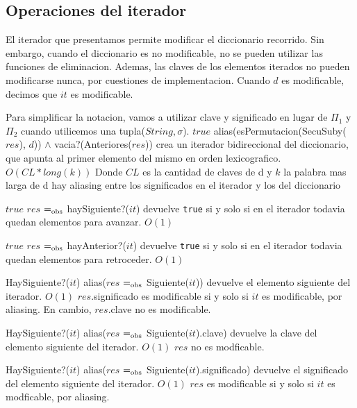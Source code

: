  
  \subsection{Operaciones del iterador}

  El iterador que presentamos permite modificar el diccionario recorrido.  Sin embargo, cuando el diccionario es no modificable, no se pueden utilizar las funciones de eliminacion.  Ademas, las claves de los elementos iterados no pueden modificarse nunca, por cuestiones de implementacion.  Cuando $d$ es modificable, decimos que $it$ es modificable.
  

  Para simplificar la notacion, vamos a utilizar clave y significado en lugar de $\Pi_1$ y $\Pi_2$ cuando utilicemos una tupla($String,\sigma$).
 {$true$}
 {alias(esPermutacion(SecuSuby($res$), $d$)) $\land$ vacia?(Anteriores($res$))}
 {crea un iterador bidireccional del diccionario, que apunta al primer elemento del mismo en orden lexicografico.}
  {$O(CL*long(k))$ Donde $CL$ es la cantidad de claves de d y $k$ la palabra mas larga de d}
  {hay aliasing entre los significados en el iterador y los del diccionario}


	{$true$}  
  {$res$ $=_{\mathrm{obs}}$ haySiguiente?($it$)}
  {devuelve \texttt{true} si y solo si en el iterador todavia quedan elementos para avanzar.}
  {$O(1)$}
  {}

	{$true$}    
  {$res$ $=_{\mathrm{obs}}$ hayAnterior?($it$)}
  {devuelve \texttt{true} si y solo si en el iterador todavia quedan elementos para retroceder.}
  {$O(1)$}
  {}

  {HaySiguiente?($it$)}
  {alias($res$ $=_{\mathrm{obs}}$ Siguiente($it$))}
  {devuelve el elemento siguiente del iterador.}
  {$O(1)$}
  {$res$.significado es modificable si y solo si $it$ es modificable, por aliasing.  En cambio, $res$.clave no es modificable.}
  
  {HaySiguiente?($it$)}
  {alias($res$ $=_{\mathrm{obs}}$ Siguiente($it$).clave)}
  {devuelve la clave del elemento siguiente del iterador.}
  {$O(1)$}
  {$res$ no es modficable.}

  {HaySiguiente?($it$)}
  {alias($res$ $=_{\mathrm{obs}}$ Siguiente($it$).significado)}
  {devuelve el significado del elemento siguiente del iterador.}
  {$O(1)$}
  {$res$ es modificable si y solo si $it$ es modficable, por aliasing.}


